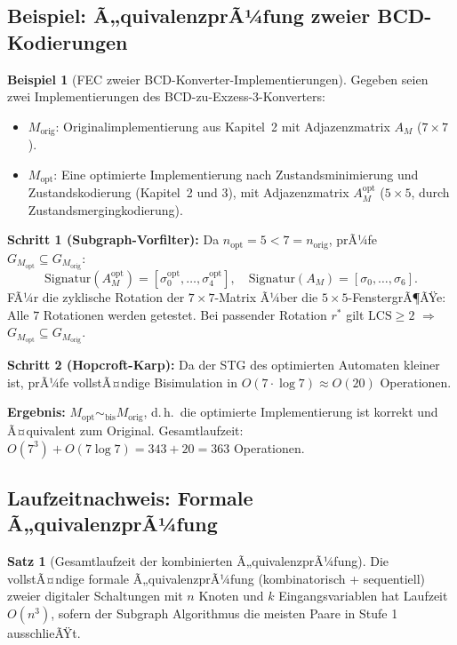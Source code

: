 ﻿\documentclass[a4paper,12pt]{article}
\theoremstyle{definition}
\newtheorem{beispiel}{Beispiel}
\newtheorem{satz}{Satz}
\begin{document}
\subsection{Beispiel: Ã„quivalenzprÃ¼fung zweier BCD-Kodierungen}

\begin{beispiel}[FEC zweier BCD-Konverter-Implementierungen]\label{bsp:fec_bcd}
  Gegeben seien zwei Implementierungen des BCD-zu-Exzess-3-Konverters:
  \begin{itemize}
    \item $M_{\text{orig}}$: Originalimplementierung aus Kapitel~2 mit
          Adjazenzmatrix $A_M$ ($7 \times 7$).
    \item $M_{\text{opt}}$: Eine optimierte Implementierung nach Zustandsminimierung
          und Zustandskodierung (Kapitel~2 und 3), mit Adjazenzmatrix $A_M^{\text{opt}}$
          ($5 \times 5$, durch Zustandsmergingkodierung).
  \end{itemize}

  \textbf{Schritt 1 (Subgraph-Vorfilter):}
  Da $n_{\text{opt}} = 5 < 7 = n_{\text{orig}}$, prÃ¼fe $G_{M_{\text{opt}}} \subseteq G_{M_{\text{orig}}}$:
  \[
    \text{Signatur}(A_M^{\text{opt}}) = [\sigma_0^{\text{opt}}, \ldots, \sigma_4^{\text{opt}}],
    \quad
    \text{Signatur}(A_M) = [\sigma_0, \ldots, \sigma_6].
  \]
  FÃ¼r die zyklische Rotation der $7 \times 7$-Matrix Ã¼ber die $5 \times 5$-FenstergrÃ¶ÃŸe:
  Alle $7$ Rotationen werden getestet. Bei passender Rotation $r^*$ gilt
  $\text{LCS} \geq 2$ $\Rightarrow$ $G_{M_{\text{opt}}} \subseteq G_{M_{\text{orig}}}$.

  \textbf{Schritt 2 (Hopcroft-Karp):}
  Da der STG des optimierten Automaten kleiner ist, prÃ¼fe vollstÃ¤ndige Bisimulation in
  $O(7 \cdot \log 7) \approx O(20)$ Operationen.

  \textbf{Ergebnis:} $M_{\text{opt}} \sim_{\text{bis}} M_{\text{orig}}$,
  d.\,h.\ die optimierte Implementierung ist korrekt und Ã¤quivalent zum Original.
  Gesamtlaufzeit: $O(7^3) + O(7 \log 7) = 343 + 20 = 363$ Operationen.
\end{beispiel}

\subsection{Laufzeitnachweis: Formale Ã„quivalenzprÃ¼fung}

\begin{satz}[Gesamtlaufzeit der kombinierten Ã„quivalenzprÃ¼fung]\label{satz:feclaufzeit}
  Die vollstÃ¤ndige formale Ã„quivalenzprÃ¼fung (kombinatorisch + sequentiell) zweier
  digitaler Schaltungen mit $n$ Knoten und $k$ Eingangsvariablen hat Laufzeit $O(n^3)$,
  sofern der Subgraph Algorithmus die meisten Paare in Stufe 1 ausschlieÃŸt.
\end{satz}
\end{document}
